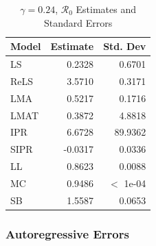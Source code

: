 \documentclass[12pt]{article}
\newcommand{\rr}{\ensuremath{\mathcal{R}_0}}
\begin{document}
\begin{table}[H]
	
	\centering
	\begin{tabular}[t]{l|r|r}
		\hline
		Model & Estimate & Std. Dev\\
		\hline
		LS & 0.2328 & 0.6701\\
		\hline
		ReLS & 3.5710 & 0.3171\\
		\hline
		LMA & 0.5217 & 0.1716\\
		\hline
		LMAT & 0.3872 & 4.8818\\
		\hline
		IPR & 6.6728 & 89.9362\\
		\hline
		SIPR & -0.0317 & 0.0336\\
		\hline
		LL & 0.8623 & 0.0088\\
		\hline
		MC & 0.9486 & $<$ 1e-04\\
		\hline
		SB & 1.5587 & 0.0653\\
		\hline
	\end{tabular}
	\caption{$\gamma = 0.24$, $\rr$ Estimates and Standard Errors}
\end{table}

\subsubsection{Autoregressive Errors}
\end{document}
